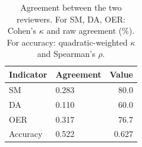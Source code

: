 \begin{table}[H]
\caption{Agreement between the two reviewers. For SM, DA, OER: Cohen's $\kappa$ and raw agreement (\%). For accuracy: quadratic-weighted $\kappa$ and Spearman's $\rho$.}
\label{tab:reviewer:agreement}
\centering
\begin{tabular}{llr}
\toprule
Indicator & Agreement & Value \\
\midrule
SM & 0.283 & 80.0 \\
DA & 0.110 & 60.0 \\
OER & 0.317 & 76.7 \\
Accuracy & 0.522 & 0.627 \\
\bottomrule
\end{tabular}
\end{table}
